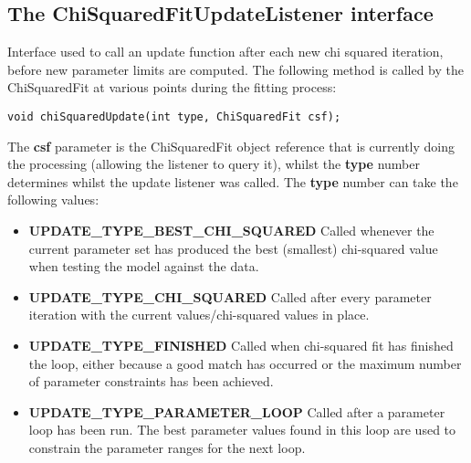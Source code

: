 \documentclass[10pt,a4paper]{article}
\begin{document}
\subsection{The ChiSquaredFitUpdateListener interface}
Interface used to call an update function after each new chi squared iteration, 
before new parameter limits are computed.
The following method is called by the ChiSquaredFit at various points during the fitting process:
\begin{verbatim}
void chiSquaredUpdate(int type, ChiSquaredFit csf);
\end{verbatim}
The {\bf csf} parameter is the ChiSquaredFit object reference that is currently doing the processing
(allowing the listener to query it), whilst the {\bf type} number determines whilst the update listener was called.
The {\bf type} number can take the following values:
\begin{itemize}
\item {\bf UPDATE\_TYPE\_BEST\_CHI\_SQUARED} Called whenever the current parameter set has produced the 
best (smallest) chi-squared value when testing the model against the data.
\item {\bf UPDATE\_TYPE\_CHI\_SQUARED} Called after every parameter iteration with the current
values/chi-squared values in place.
\item {\bf UPDATE\_TYPE\_FINISHED} Called when chi-squared fit has finished the loop, either because a good
match has occurred or the maximum number of parameter constraints has been achieved.
\item {\bf UPDATE\_TYPE\_PARAMETER\_LOOP} Called after a parameter loop has been run. The best 
parameter values found in this loop are used to constrain the parameter ranges for the next loop.
\end{itemize}
\end{document}
